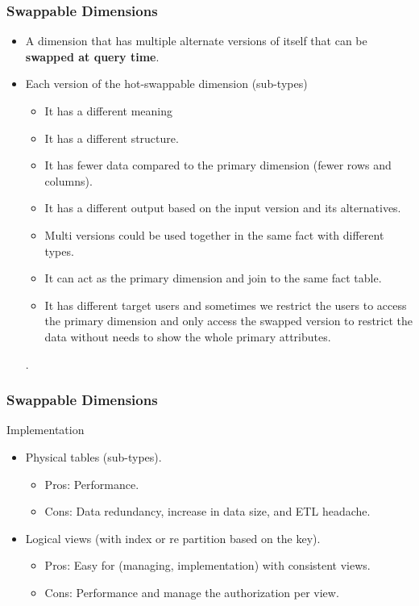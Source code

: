 \begin{frame}
\frametitle{Swappable Dimensions}
	\begin{itemize}[<+->]
		\item A dimension that has multiple alternate versions of itself that can be \textbf{swapped at query time}.
		\item Each version of the hot-swappable dimension (sub-types)
			\begin{itemize}[<+->]
				\item It has a different meaning
				\item It has a different structure.
				\item It has fewer data compared to the primary dimension (fewer rows and columns).
				\item It has a different output based on the input version and its alternatives.
				\item Multi versions could be used together in the same fact with different types.
				\item It can act as the primary dimension and join to the same fact table.
				\item It has different target users and sometimes we restrict the users to access the primary dimension and only access the swapped version to restrict the data without needs to show the whole primary attributes.

			\end{itemize}.
	\end{itemize}
	
\end{frame}
\begin{frame}
\frametitle{Swappable Dimensions}
\centering

\begin{block}{Implementation}
	\begin{itemize}
		\item Physical tables (sub-types).
		\begin{itemize}
			\item Pros: Performance.
			\item Cons: Data redundancy, increase in data size, and ETL headache.
		\end{itemize}
		\item Logical views (with index or re partition based on the key).%
		\begin{itemize}
			\item Pros: Easy for (managing, implementation) with consistent views.
			\item Cons: Performance and manage the authorization per view.
		\end{itemize}		
	\end{itemize}
\end{block}
\end{frame}
